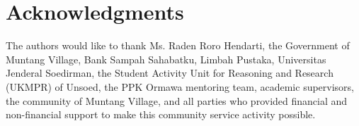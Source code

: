 \documentclass[conference, compsoc, twoside]{IEEEtran}
\begin{document}
\section*{Acknowledgments}
The authors would like to thank Ms. Raden Roro Hendarti, the Government of Muntang Village, Bank Sampah Sahabatku, Limbah Pustaka, Universitas Jenderal Soedirman, the Student Activity Unit for Reasoning and Research (UKMPR) of Unsoed, the PPK Ormawa mentoring team, academic supervisors, the community of Muntang Village, and all parties who provided financial and non-financial support to make this community service activity possible.



\end{document}
